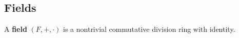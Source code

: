 \subsection{Fields}\label{subsec:fields}

\begin{definition}\label{def:field}
  A \textbf{field} \( (F, +, \cdot) \) is a nontrivial commutative division ring with identity.
\end{definition}
